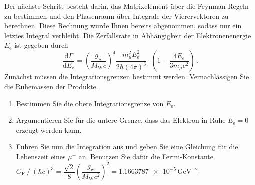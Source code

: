\documentclass{exercise}
\begin{document}
    Der nächste Schritt besteht darin, das Matrixelement über die Feynman-Regeln zu bestimmen und den Phasenraum über Integrale der Vierervektoren zu berechnen.
    Diese Rechnung wurde Ihnen bereits abgenommen, sodass nur ein letztes Integral verbleibt. 
    Die Zerfallsrate in Abhängigkeit der Elektronenenergie $E_\text{e}$ ist gegeben durch 
    \begin{equation}
        \dfrac{\mathrm{d} \Gamma}{\mathrm{d} E_\text{e}} = \left(\dfrac{g_\text{w}}{M_\text{W}c}\right)^4 \dfrac{m_\mu^2 E^2_\text{e}}{2\hbar \left( 4 \pi\right)^3} \cdot \left(1 - \dfrac{4 E_e}{3 m_\mu c^2}\right) \,.
    \end{equation}
    Zunächst müssen die Integrationsgrenzen bestimmt werden. Vernachlässigen Sie die Ruhemassen der Produkte.
    \begin{enumerate}[resume] 
        \item Bestimmen Sie die obere Integrationsgrenze von $E_\text{e}$. 
        \item Argumentieren Sie für die untere Grenze, dass das Elektron in Ruhe $E_\text{e} = 0$ erzeugt werden kann.  
    
        \item Führen Sie nun die Integration aus und geben Sie eine Gleichung für die Lebenszeit eines $\mu^-$ an. Benutzen Sie dafür die Fermi-Konstante $G_\text{F}\mathbin{/} \left(\hbar c\right)^3 = \dfrac{\sqrt{2}}{8} \left(\dfrac{g_\text{w}}{{M_\text{W} c^2}}\right)^2 = \num{1.1663787e-5}\,\si{\giga\electronvolt^{-2}} $.


\end{enumerate}
\end{document}
